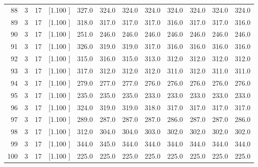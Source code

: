 \documentclass[12pt,a4paper]{article}
\begin{document}
\begin{center}
{\begin{tabular}{r r r r r r r r r r r r}
  88&  3& 17&[1.100     ]&   327.0&   324.0&   324.0&   324.0&   324.0&   324.0&   324.0&   324.0\\[-0.02in]
  89&  3& 17&[1.100     ]&   318.0&   317.0&   317.0&   317.0&   316.0&   317.0&   317.0&   316.0\\[-0.02in]
  90&  3& 17&[1.100     ]&   251.0&   246.0&   246.0&   246.0&   246.0&   246.0&   246.0&   246.0\\[-0.02in]
  91&  3& 17&[1.100     ]&   326.0&   319.0&   319.0&   317.0&   316.0&   316.0&   316.0&   316.0\\[-0.02in]
  92&  3& 17&[1.100     ]&   315.0&   316.0&   315.0&   313.0&   312.0&   312.0&   312.0&   312.0\\[-0.02in]
  93&  3& 17&[1.100     ]&   317.0&   312.0&   312.0&   312.0&   311.0&   312.0&   311.0&   311.0\\[-0.02in]
  94&  3& 17&[1.100     ]&   279.0&   277.0&   277.0&   276.0&   276.0&   276.0&   276.0&   276.0\\[-0.02in]
  95&  3& 17&[1.100     ]&   235.0&   235.0&   235.0&   233.0&   233.0&   233.0&   233.0&   233.0\\[-0.02in]
  96&  3& 17&[1.100     ]&   324.0&   319.0&   319.0&   318.0&   317.0&   317.0&   317.0&   317.0\\[-0.02in]
  97&  3& 17&[1.100     ]&   289.0&   287.0&   287.0&   287.0&   286.0&   287.0&   287.0&   286.0\\[-0.02in]
  98&  3& 17&[1.100     ]&   312.0&   304.0&   304.0&   303.0&   302.0&   302.0&   302.0&   302.0\\[-0.02in]
  99&  3& 17&[1.100     ]&   344.0&   345.0&   344.0&   344.0&   344.0&   344.0&   344.0&   344.0\\[-0.02in]
 100&  3& 17&[1.100     ]&   225.0&   225.0&   225.0&   225.0&   225.0&   225.0&   225.0&   225.0\\[-0.02in]

\hline
\end{tabular}}
\end{center}
\end{document}
